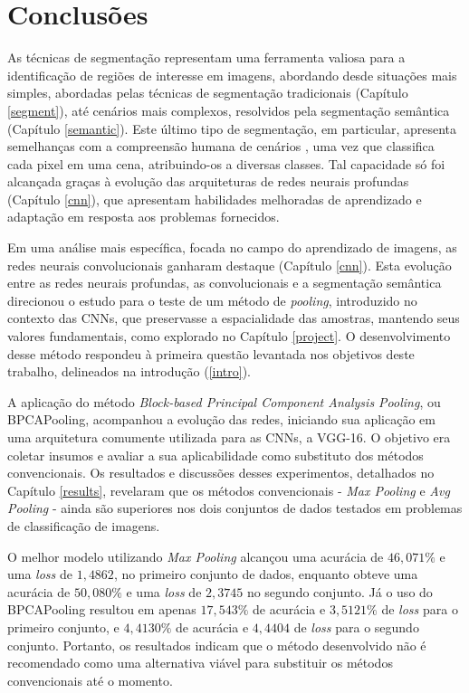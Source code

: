 \newpage
\clearpage
\section{Conclusões}
\label{conclusion}
As técnicas de segmentação representam uma ferramenta valiosa para a identificação de regiões de interesse em imagens, abordando desde situações mais simples, abordadas pelas técnicas de segmentação tradicionais (Capítulo \ref{segment}), até cenários mais complexos, resolvidos pela segmentação semântica (Capítulo \ref{semantic}). Este último tipo de segmentação, em particular, apresenta semelhanças com a compreensão humana de cenários \citep{Mohan2020}, uma vez que classifica cada pixel em uma cena, atribuindo-os a diversas classes. Tal capacidade só foi alcançada graças à evolução das arquiteturas de redes neurais profundas (Capítulo \ref{cnn}), que apresentam habilidades melhoradas de aprendizado e adaptação em resposta aos problemas fornecidos.

Em uma análise mais específica, focada no campo do aprendizado de imagens, as redes neurais convolucionais ganharam destaque (Capítulo \ref{cnn}). Esta evolução entre as redes neurais profundas, as convolucionais e a segmentação semântica direcionou o estudo para o teste de um método de \textit{pooling}, introduzido no contexto das CNNs, que preservasse a espacialidade das amostras, mantendo seus valores fundamentais, como explorado no Capítulo \ref{project}. O desenvolvimento desse método respondeu à primeira questão levantada nos objetivos deste trabalho, delineados na introdução (\ref{intro}).

A aplicação do método \textit{Block-based Principal Component Analysis Pooling}, ou BPCAPooling, acompanhou a evolução das redes, iniciando sua aplicação em uma arquitetura comumente utilizada para as CNNs, a VGG-16. O objetivo era coletar insumos e avaliar a sua aplicabilidade como substituto dos métodos convencionais. Os resultados e discussões desses experimentos, detalhados no Capítulo \ref{results}, revelaram que os métodos convencionais - \textit{Max Pooling} e \textit{Avg Pooling} - ainda são superiores nos dois conjuntos de dados testados em problemas de classificação de imagens.

O melhor modelo utilizando \textit{Max Pooling} alcançou uma acurácia de $46,071\%$ e uma \textit{loss} de $1,4862$, no primeiro conjunto de dados, enquanto obteve uma acurácia de $50,080\%$ e uma \textit{loss} de $2,3745$ no segundo conjunto. Já o uso do BPCAPooling resultou em apenas $17,543\%$ de acurácia e $3,5121\%$ de \textit{loss} para o primeiro conjunto, e $4,4130\%$ de acurácia e $4,4404$ de \textit{loss} para o segundo conjunto. Portanto, os resultados indicam que o método desenvolvido não é recomendado como uma alternativa viável para substituir os métodos convencionais até o momento.

